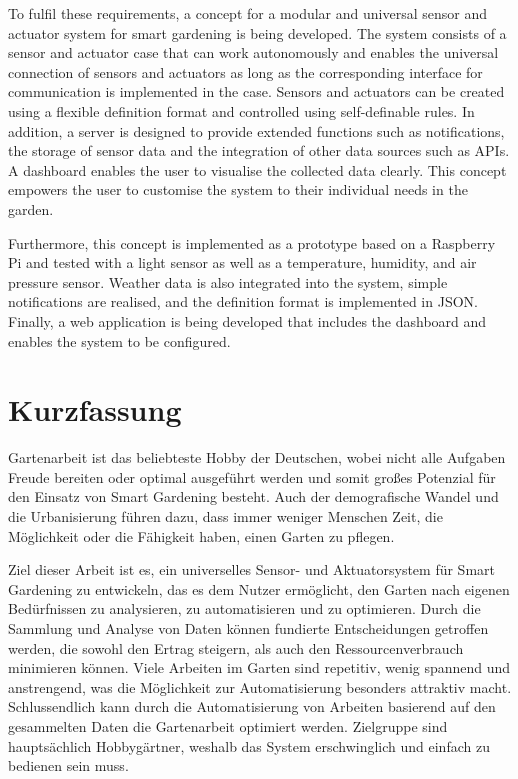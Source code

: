 To fulfil these requirements, a concept for a modular and universal sensor and actuator system for smart gardening is being developed.
The system consists of a sensor and actuator case that can work autonomously and enables the universal connection of sensors and actuators as long as the corresponding interface for communication is implemented in the case.
Sensors and actuators can be created using a flexible definition format and controlled using self-definable rules.
In addition, a server is designed to provide extended functions such as notifications, the storage of sensor data and the integration of other data sources such as APIs.
A dashboard enables the user to visualise the collected data clearly.
This concept empowers the user to customise the system to their individual needs in the garden.

Furthermore, this concept is implemented as a prototype based on a Raspberry Pi and tested with a light sensor as well as a temperature, humidity, and air pressure sensor.
Weather data is also integrated into the system, simple notifications are realised, and the definition format is implemented in JSON.
Finally, a web application is being developed that includes the dashboard and enables the system to be configured.

\cleardoublepage


\section*{\huge Kurzfassung}
Gartenarbeit ist das beliebteste Hobby der Deutschen, wobei nicht alle Aufgaben Freude bereiten oder optimal ausgeführt werden und somit großes Potenzial für den Einsatz von Smart Gardening besteht.
Auch der demografische Wandel und die Urbanisierung führen dazu, dass immer weniger Menschen Zeit, die Möglichkeit oder die Fähigkeit haben, einen Garten zu pflegen.

Ziel dieser Arbeit ist es, ein universelles Sensor- und Aktuatorsystem für Smart Gardening zu entwickeln, das es dem Nutzer ermöglicht, den Garten nach eigenen Bedürfnissen zu analysieren, zu automatisieren und zu optimieren.
Durch die Sammlung und Analyse von Daten können fundierte Entscheidungen getroffen werden, die sowohl den Ertrag steigern, als auch den Ressourcenverbrauch minimieren können.
Viele Arbeiten im Garten sind repetitiv, wenig spannend und anstrengend, was die Möglichkeit zur Automatisierung besonders attraktiv macht.
Schlussendlich kann durch die Automatisierung von Arbeiten basierend auf den gesammelten Daten die Gartenarbeit optimiert werden.
Zielgruppe sind hauptsächlich Hobbygärtner, weshalb das System erschwinglich und einfach zu bedienen sein muss.


